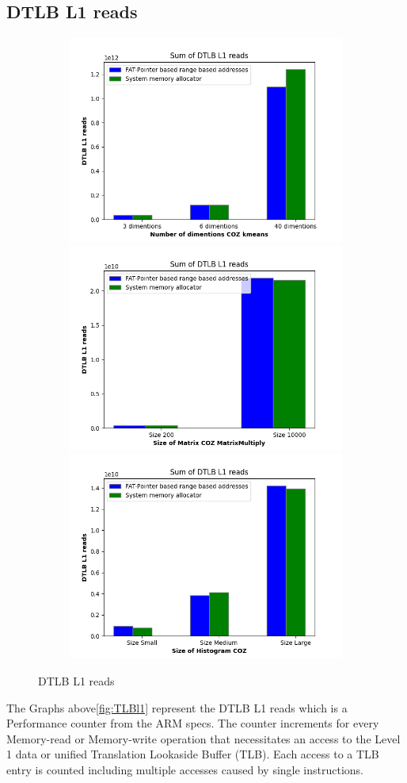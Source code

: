 \subsection{DTLB L1 reads}
\begin{figure}
  \begin{subfigure}{\linewidth}
  \includegraphics[width=.5\linewidth]{l1-tlb-kmeans.png}\hfill
  \includegraphics[width=.5\linewidth]{l1-tlb-matrixmultiply.png}\hfill
  \includegraphics[width=.5\linewidth]{l1-tlb-histogram.png}
\end{subfigure}
\caption{DTLB L1 reads}
\label{TLBl1}
\end{figure}
The Graphs above\ref{fig:TLBl1} represent the DTLB L1 reads which is a Performance counter from the ARM specs. 
The counter increments for every Memory-read or Memory-write operation that necessitates an 
access to the Level 1 data or unified Translation Lookaside Buffer (TLB). 
Each access to a TLB entry is counted including multiple accesses caused by single instructions.

